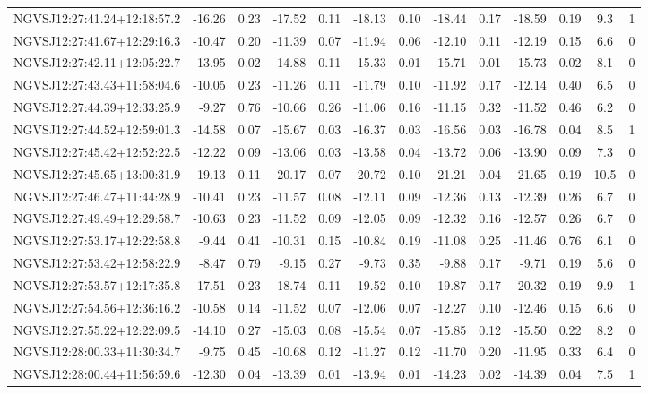 \begin{tabular}{lrrrrrrrrrrcc}
NGVSJ12:27:41.24+12:18:57.2 & -16.26 & 0.23 & -17.52 & 0.11 & -18.13 & 0.10 & -18.44 & 0.17 & -18.59 & 0.19 & 9.3 & 1 \\
NGVSJ12:27:41.67+12:29:16.3 & -10.47 & 0.20 & -11.39 & 0.07 & -11.94 & 0.06 & -12.10 & 0.11 & -12.19 & 0.15 & 6.6 & 0 \\
NGVSJ12:27:42.11+12:05:22.7 & -13.95 & 0.02 & -14.88 & 0.11 & -15.33 & 0.01 & -15.71 & 0.01 & -15.73 & 0.02 & 8.1 & 0 \\
NGVSJ12:27:43.43+11:58:04.6 & -10.05 & 0.23 & -11.26 & 0.11 & -11.79 & 0.10 & -11.92 & 0.17 & -12.14 & 0.40 & 6.5 & 0 \\
NGVSJ12:27:44.39+12:33:25.9 & -9.27 & 0.76 & -10.66 & 0.26 & -11.06 & 0.16 & -11.15 & 0.32 & -11.52 & 0.46 & 6.2 & 0 \\
NGVSJ12:27:44.52+12:59:01.3 & -14.58 & 0.07 & -15.67 & 0.03 & -16.37 & 0.03 & -16.56 & 0.03 & -16.78 & 0.04 & 8.5 & 1 \\
NGVSJ12:27:45.42+12:52:22.5 & -12.22 & 0.09 & -13.06 & 0.03 & -13.58 & 0.04 & -13.72 & 0.06 & -13.90 & 0.09 & 7.3 & 0 \\
NGVSJ12:27:45.65+13:00:31.9 & -19.13 & 0.11 & -20.17 & 0.07 & -20.72 & 0.10 & -21.21 & 0.04 & -21.65 & 0.19 & 10.5 & 0 \\
NGVSJ12:27:46.47+11:44:28.9 & -10.41 & 0.23 & -11.57 & 0.08 & -12.11 & 0.09 & -12.36 & 0.13 & -12.39 & 0.26 & 6.7 & 0 \\
NGVSJ12:27:49.49+12:29:58.7 & -10.63 & 0.23 & -11.52 & 0.09 & -12.05 & 0.09 & -12.32 & 0.16 & -12.57 & 0.26 & 6.7 & 0 \\
NGVSJ12:27:53.17+12:22:58.8 & -9.44 & 0.41 & -10.31 & 0.15 & -10.84 & 0.19 & -11.08 & 0.25 & -11.46 & 0.76 & 6.1 & 0 \\
NGVSJ12:27:53.42+12:58:22.9 & -8.47 & 0.79 & -9.15 & 0.27 & -9.73 & 0.35 & -9.88 & 0.17 & -9.71 & 0.19 & 5.6 & 0 \\
NGVSJ12:27:53.57+12:17:35.8 & -17.51 & 0.23 & -18.74 & 0.11 & -19.52 & 0.10 & -19.87 & 0.17 & -20.32 & 0.19 & 9.9 & 1 \\
NGVSJ12:27:54.56+12:36:16.2 & -10.58 & 0.14 & -11.52 & 0.07 & -12.06 & 0.07 & -12.27 & 0.10 & -12.46 & 0.15 & 6.6 & 0 \\
NGVSJ12:27:55.22+12:22:09.5 & -14.10 & 0.27 & -15.03 & 0.08 & -15.54 & 0.07 & -15.85 & 0.12 & -15.50 & 0.22 & 8.2 & 0 \\
NGVSJ12:28:00.33+11:30:34.7 & -9.75 & 0.45 & -10.68 & 0.12 & -11.27 & 0.12 & -11.70 & 0.20 & -11.95 & 0.33 & 6.4 & 0 \\
NGVSJ12:28:00.44+11:56:59.6 & -12.30 & 0.04 & -13.39 & 0.01 & -13.94 & 0.01 & -14.23 & 0.02 & -14.39 & 0.04 & 7.5 & 1 \\

\end{tabular}
